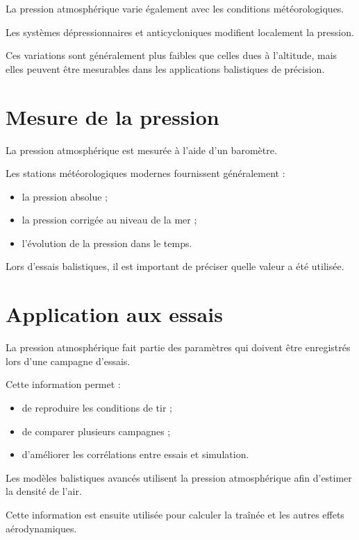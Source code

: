La pression atmosphérique varie également avec les conditions
météorologiques.

Les systèmes dépressionnaires et anticycloniques modifient localement la
pression.

Ces variations sont généralement plus faibles que celles dues à l'altitude,
mais elles peuvent être mesurables dans les applications balistiques de
précision.

\section{Mesure de la pression}

La pression atmosphérique est mesurée à l'aide d'un baromètre.

Les stations météorologiques modernes fournissent généralement :

\begin{itemize}
\item la pression absolue ;
\item la pression corrigée au niveau de la mer ;
\item l'évolution de la pression dans le temps.
\end{itemize}

Lors d'essais balistiques, il est important de préciser quelle valeur a été
utilisée.

\section{Application aux essais}

La pression atmosphérique fait partie des paramètres qui doivent être
enregistrés lors d'une campagne d'essais.

Cette information permet :

\begin{itemize}
\item de reproduire les conditions de tir ;
\item de comparer plusieurs campagnes ;
\item d'améliorer les corrélations entre essais et simulation.
\end{itemize}

\begin{simulation}

Les modèles balistiques avancés utilisent la pression atmosphérique afin
d'estimer la densité de l'air.

Cette information est ensuite utilisée pour calculer la traînée et les autres
effets aérodynamiques.

\end{simulation}

